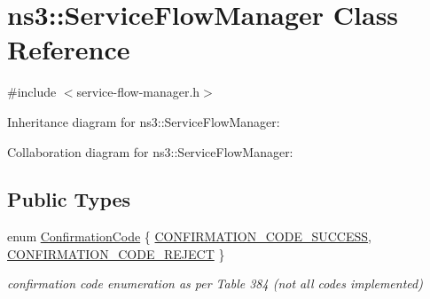 \hypertarget{classns3_1_1ServiceFlowManager}{}\section{ns3\+:\+:Service\+Flow\+Manager Class Reference}
\label{classns3_1_1ServiceFlowManager}


{\ttfamily \#include $<$service-\/flow-\/manager.\+h$>$}



Inheritance diagram for ns3\+:\+:Service\+Flow\+Manager\+:


Collaboration diagram for ns3\+:\+:Service\+Flow\+Manager\+:
\subsection*{Public Types}
\begin{DoxyCompactItemize}
\item 
enum \hyperlink{classns3_1_1ServiceFlowManager_a0b7aa88cbfeaf776708ccc01d74159b2}{Confirmation\+Code} \{ \hyperlink{classns3_1_1ServiceFlowManager_a0b7aa88cbfeaf776708ccc01d74159b2a6eff8dd250603d6e3f56e365719d5c33}{C\+O\+N\+F\+I\+R\+M\+A\+T\+I\+O\+N\+\_\+\+C\+O\+D\+E\+\_\+\+S\+U\+C\+C\+E\+SS}, 
\hyperlink{classns3_1_1ServiceFlowManager_a0b7aa88cbfeaf776708ccc01d74159b2a273ac9a4fbff8000572477501f6180c1}{C\+O\+N\+F\+I\+R\+M\+A\+T\+I\+O\+N\+\_\+\+C\+O\+D\+E\+\_\+\+R\+E\+J\+E\+CT}
 \}\begin{DoxyCompactList}\small\item\em confirmation code enumeration as per Table 384 (not all codes implemented) \end{DoxyCompactList}
\end{DoxyCompactItemize}
